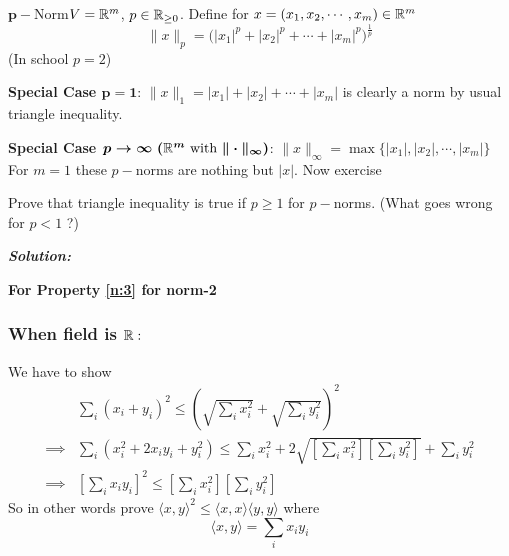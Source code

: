 \documentclass{report}
\newcommand{\ex}[2]{\begin{Example}{#1}{}#2\end{Example}}
\newcommand{\qs}[2]{\begin{question}{#1}{}#2\end{question}}
\newcommand{\bs}[1]{\boldsymbol{#1}}
\newcommand{\sol}{\setlength{\parindent}{0cm}\textbf{\textit{Solution:}}\setlength{\parindent}{1cm} }
\begin{document}
\ex{$\bs{p-}$Norm}{\label{pnorm}$V={\mathbb{R}}^m$, $p\in\mathbb{R}_{\geq 0}$. Define for $x=(x_1,x_2,\cdots,x_m)\in\mathbb{R}^m$ $$\|x\|_p=\Big(|x_1|^p+|x_2|^p+\cdots+|x_m|^p\Big)^{\frac1p}$$(In school $p=2$)}
\textbf{Special Case $\bs{p=1}$}: $\|x\|_1=|x_1|+|x_2|+\cdots+|x_m|$ is clearly a norm by usual triangle inequality. \par
\textbf{Special Case $\bs{p\to\infty\ (\bbR^m$ with $\|\cdot\|_{\infty})}$}: $\|x\|_{\infty}=\max\{|x_1|,|x_2|,\cdots,|x_m|\}$\\
For $m=1$ these $p-$norms are nothing but $|x|$.
Now exercise
\qs{}{\label{exs1}Prove that triangle inequality is true if $p\geq 1$ for $p-$norms. (What goes wrong for $p<1$ ?)}
\sol{\textbf{For Property \ref{n:3} for norm-2}	\subsubsection*{\textbf{When field is $\mathbb{R}:$}} We have to show\begin{align*}
		         & \sum_i(x_i+y_i)^2\leq \left(\sqrt{\sum_ix_i^2} +\sqrt{\sum_iy_i^2}\right)^2                                       \\
		\implies & \sum_i (x_i^2+2x_iy_i+y_i^2)\leq \sum_ix_i^2+2\sqrt{\left[\sum_ix_i^2\right]\left[\sum_iy_i^2\right]}+\sum_iy_i^2 \\
		\implies & \left[\sum_ix_iy_i\right]^2\leq \left[\sum_ix_i^2\right]\left[\sum_iy_i^2\right]
	\end{align*}So in other words prove $\langle x,y\rangle^2 \leq \langle x,x\rangle\langle y,y\rangle$ where
	$$\langle x,y\rangle =\sum\limits_i x_iy_i$$

}
\end{document}
